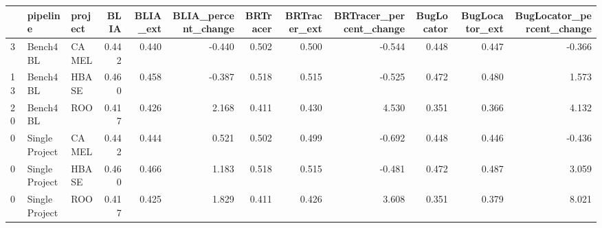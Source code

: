 \begin{tabular}{lllrrrrrrrrr}
\toprule
{} &        pipeline & project &  BLIA &  BLIA\_ext &  BLIA\_percent\_change &  BRTracer &  BRTracer\_ext &  BRTracer\_percent\_change &  BugLocator &  BugLocator\_ext &  BugLocator\_percent\_change \\
\midrule
3  &        Bench4BL &   CAMEL & 0.442 &     0.440 &               -0.440 &     0.502 &         0.500 &                   -0.544 &       0.448 &           0.447 &                     -0.366 \\
13 &        Bench4BL &   HBASE & 0.460 &     0.458 &               -0.387 &     0.518 &         0.515 &                   -0.525 &       0.472 &           0.480 &                      1.573 \\
20 &        Bench4BL &     ROO & 0.417 &     0.426 &                2.168 &     0.411 &         0.430 &                    4.530 &       0.351 &           0.366 &                      4.132 \\
0  &  Single Project &   CAMEL & 0.442 &     0.444 &                0.521 &     0.502 &         0.499 &                   -0.692 &       0.448 &           0.446 &                     -0.436 \\
0  &  Single Project &   HBASE & 0.460 &     0.466 &                1.183 &     0.518 &         0.515 &                   -0.481 &       0.472 &           0.487 &                      3.059 \\
0  &  Single Project &     ROO & 0.417 &     0.425 &                1.829 &     0.411 &         0.426 &                    3.608 &       0.351 &           0.379 &                      8.021 \\
\bottomrule
\end{tabular}
